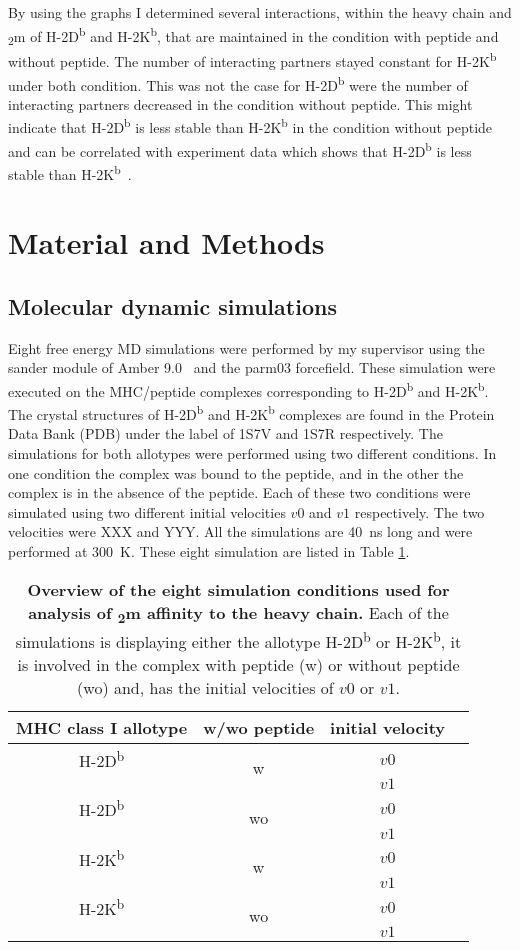 \documentclass[11pt,twocolumn]{article}
\newcommand{\db}{H-2D\textsuperscript{b}\xspace}
\newcommand{\kb}{H-2K\textsuperscript{b}\xspace}
\newcommand{\btm}{\textbeta\textsubscript{2}m\xspace}
\begin{document}
By using the graphs I determined several interactions, within the heavy chain and \btm of \db and \kb, that are maintained in the condition with peptide and  without peptide. The number of interacting partners stayed constant for \kb under both condition. This was not the case for \db were the number of interacting partners decreased in the condition without peptide. This might indicate that \db is less stable than \kb in the condition without peptide and can be correlated with experiment data which shows that \db is less stable than \kb~\cite{Shields1999561}.

\section*{Material and Methods}

\subsection*{Molecular dynamic simulations}

Eight free energy MD simulations were  performed by my supervisor using the sander module of Amber 9.0~\cite{case2005amber} and the parm03 forcefield.
These simulation were executed on the  MHC/peptide complexes corresponding to  \db and  \kb. 
The crystal structures of \db and  \kb complexes are found in the Protein Data Bank (PDB) under the label of 1S7V and  1S7R respectively. 
The simulations for both allotypes were performed using two different conditions. 
In one condition the complex was bound to the peptide, and in the other  the complex is in the absence of the peptide. 
Each of these two conditions were simulated using two different initial velocities $v0$ and $v1$ respectively. The two velocities were XXX and YYY. 
All the simulations are \SI{40}{\nano\second} long and were performed  at \SI{300}{\kelvin}. These eight simulation are listed in Table \ref{simulations}.


\begin{table}[H]
\caption{\textbf{Overview of the eight simulation conditions used for analysis of \btm affinity to the heavy chain.} Each of the simulations is displaying either the allotype \db or \kb, it is involved in the complex with peptide (w) or without peptide (wo) and, has the initial velocities of $v0$ or $v1$.}
\label{simulations}
\centering 
\resizebox{0.4\textwidth}{!} {
\begin{tabular}{|c|c|c|c|}  \hline
MHC class I allotype& w/wo peptide&initial velocity\\ \hline
\db&\multirow{2}{*}{w}&$v0$\\
&&$v1$\\  \hline
\db&\multirow{2}{*}{wo}&$v0$\\
&&$v1$\\  \hline
\kb&\multirow{2}{*}{w}&$v0$\\
&&$v1$\\  \hline
\kb&\multirow{2}{*}{wo}&$v0$\\
&&$v1$\\  \hline

\end{tabular}
}
\end{table}
\end{document}
